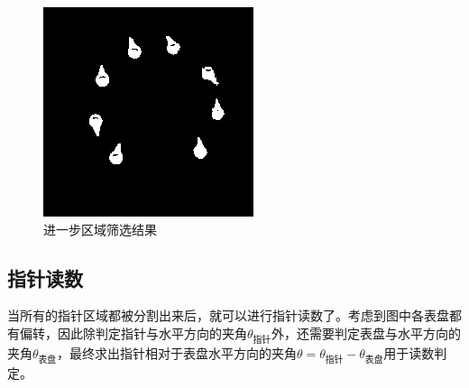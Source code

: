 \documentclass[a4paper]{ctexart}
\begin{document}
\begin{enumerate}[label=\arabic*、]
\begin{figure}[htbp]
\begin{minipage}[t]{0.25\textwidth}
			\includegraphics[width=\textwidth]{figure/drop_center/img5.jpg}
		\end{minipage}
		\caption{进一步区域筛选结果}\label{fig:进一步筛选结果}
	\end{figure}
\end{enumerate}
\newpage

\subsection{指针读数}
当所有的指针区域都被分割出来后，就可以进行指针读数了。考虑到图中各表盘都有偏转，因此除判定指针与水平方向的夹角$\theta_{\text{指针}}$外，还需要判定表盘与水平方向的夹角$\theta_{\text{表盘}}$，最终求出指针相对于表盘水平方向的夹角$\theta=\theta_{\text{指针}}-\theta_{\text{表盘}}$用于读数判定。
\end{document}
